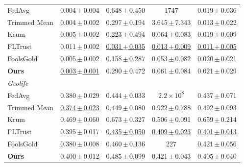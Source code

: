 \begin{table}[t]
\begin{tabular}{lcccc}
FedAvg & 0.004\,$\pm$\,0.004 & 0.648\,$\pm$\,0.450 & 1747 & 0.019\,$\pm$\,0.036 \\
Trimmed Mean & 0.004\,$\pm$\,0.002 & 0.297\,$\pm$\,0.194 & 3.645\,$\pm$\,7.343 & 0.013\,$\pm$\,0.022 \\
Krum & 0.005\,$\pm$\,0.002 & 0.223\,$\pm$\,0.494 & 0.064\,$\pm$\,0.083 & 0.019\,$\pm$\,0.009 \\
FLTrust & 0.011\,$\pm$\,0.002 & \underline{0.031\,$\pm$\,0.035} & \underline{0.013\,$\pm$\,0.009} & \underline{0.011\,$\pm$\,0.005} \\
FoolsGold & 0.005\,$\pm$\,0.002 & 0.158\,$\pm$\,0.287 & 0.053\,$\pm$\,0.082 & 0.020\,$\pm$\,0.021 \\
\textbf{Ours} & \underline{0.003\,$\pm$\,0.001} & 0.290\,$\pm$\,0.472 & 0.061\,$\pm$\,0.084 & 0.021\,$\pm$\,0.029 \\
\midrule
\multicolumn{5}{l}{\textit{Geolife}} \\
FedAvg & 0.380\,$\pm$\,0.029 & 0.444\,$\pm$\,0.033 & $2.2{\times}10^{8}$ & 0.437\,$\pm$\,0.071 \\
Trimmed Mean & \underline{0.374\,$\pm$\,0.023} & 0.449\,$\pm$\,0.080 & 0.922\,$\pm$\,0.788 & 0.492\,$\pm$\,0.093 \\
Krum & 0.469\,$\pm$\,0.060 & 0.673\,$\pm$\,0.327 & 0.506\,$\pm$\,0.091 & 0.659\,$\pm$\,0.214 \\
FLTrust & 0.395\,$\pm$\,0.017 & \underline{0.435\,$\pm$\,0.050} & \underline{0.409\,$\pm$\,0.023} & \underline{0.401\,$\pm$\,0.013} \\
FoolsGold & 0.380\,$\pm$\,0.008 & 0.460\,$\pm$\,0.136 & 227 & 0.421\,$\pm$\,0.056 \\
\textbf{Ours} & 0.400\,$\pm$\,0.012 & 0.485\,$\pm$\,0.099 & 0.421\,$\pm$\,0.043 & 0.405\,$\pm$\,0.040 \\
\bottomrule
\end{tabular}
\end{table}

